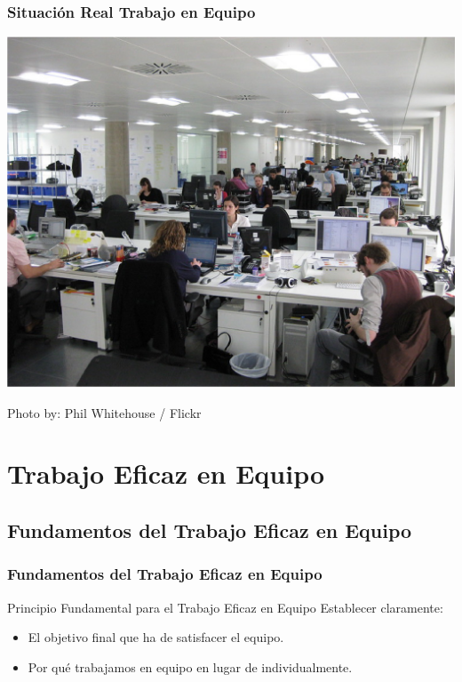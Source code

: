 \documentclass[a4paper,t,xcolor=pst,dvips]{beamer}
\begin{document}
\begin{frame}[c]
	\frametitle{Situación Real Trabajo en Equipo}
	\begin{center}
		\includegraphics[width=0.73\linewidth,keepaspectratio=true]{images/motivacion01.eps}
	\end{center}
	\begin{flushright}
		\tiny{Photo by: Phil Whitehouse / Flickr}
	\end{flushright}
\end{frame}

\section{Trabajo Eficaz en Equipo}

\subsection{Fundamentos del Trabajo Eficaz en Equipo}

\begin{frame}[c]
	\frametitle{Fundamentos del Trabajo Eficaz en Equipo}
	\begin{block}{Principio Fundamental para el Trabajo Eficaz en Equipo}
		Establecer claramente:
		\begin{itemize}
			\item<2-> El objetivo final que ha de satisfacer el equipo.
			\item<3-> Por qué trabajamos en equipo en lugar de individualmente.
		\end{itemize}
	\end{block}
\end{frame}
\end{document}
